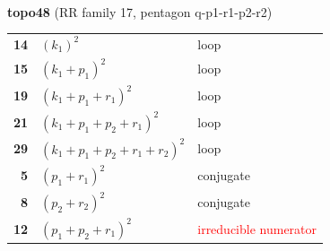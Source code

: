 \documentclass[10pt]{article}
\begin{document}
\begin{minipage}[t]{0.48\textwidth}
{}\\[2mm]\textbf{topo48} (RR family 17, pentagon q-p1-r1-p2-r2)\\[2pt]{\footnotesize\begin{tabular}{@{}r@{\ \ }l@{\ \ }l@{}}\textbf{14} & $(k_1)^2$ & loop\\
\textbf{15} & $(k_1+p_1)^2$ & loop\\
\textbf{19} & $(k_1+p_1+r_1)^2$ & loop\\
\textbf{21} & $(k_1+p_1+p_2+r_1)^2$ & loop\\
\textbf{29} & $(k_1+p_1+p_2+r_1+r_2)^2$ & loop\\
\textbf{5} & $(p_1+r_1)^2$ & conjugate\\
\textbf{8} & $(p_2+r_2)^2$ & conjugate\\
\textbf{12} & $(p_1+p_2+r_1)^2$ & \textcolor{red}{irreducible numerator}\\\end{tabular}}\end{minipage}

\bigskip
\end{document}
